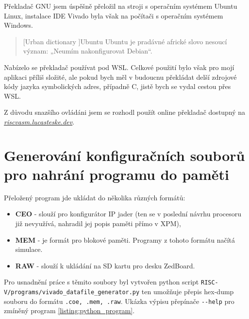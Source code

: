 \documentclass[FM,BP]{tulthesis}
\begin{document}
Překladač GNU jsem úspěšně přeložil na stroji s operačním systémem Ubuntu Linux, instalace IDE Vivado byla však na počítači s operačním systémem Windows. 

\begin{quote}[Urban dictionary \cite{urbandictionary_Ubuntu}]{Ubuntu}
Ubuntu je pradávné africké slovo nesoucí význam: „Neumím nakonfigurovat Debian“.
\end{quote}

Nabízelo se překladač používat pod WSL. Celkové použití bylo však pro mojí aplikaci příliš složité, ale pokud bych měl v budoucnu překládat delší zdrojové kódy jazyka symbolických adres, případně C, jistě bych se vydal cestou přes WSL. 

Z důvodu snazšího ovládáni jsem se rozhodl použít online překladač dostupný na \href{https://riscvasm.lucasteske.dev/#}{\emph{riscvasm.lucasteske.dev}}.


\newpage

\section{Generování konfiguračních souborů pro nahrání programu do paměti} \label{kap:generování souborů s programem}
Přeložený program jde ukládat do několika různých formátů:
\begin{itemize}
    \item \textbf{CEO} - slouží pro konfigurátor IP jader (ten se v poslední návrhu procesoru již nevyužívá, nahradil jej popis paměti přímo v XPM),
    \item \textbf{MEM} - je formát pro blokové paměti. Programy z tohoto formátu načítá simulace.
    \item \textbf{RAW} - slouží k ukládání na SD kartu pro desku ZedBoard.
\end{itemize}
Pro usnadnění práce s těmito soubory byl vytvořen python script \verb|RISC-V/programs/vivado_datafile_generator.py| ten umožňuje přepis hex-dump souboru do formátu \verb|.coe, .mem, .raw|. Ukázka výpisu přepínače \verb|--help| pro zmíněný program \ref{listing:python_program}.
\end{document}
